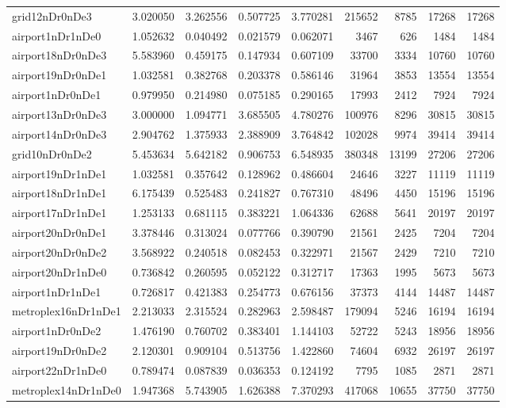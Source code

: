 \begin{longtable}{|l|r|r|r|r|r|r|r|r|}
grid12nDr0nDe3 & 3.020050 & 3.262556 & 0.507725 & 3.770281 & 215652 & 8785 & 17268 & 17268 \\
airport1nDr1nDe0 & 1.052632 & 0.040492 & 0.021579 & 0.062071 & 3467 & 626 & 1484 & 1484 \\
airport18nDr0nDe3 & 5.583960 & 0.459175 & 0.147934 & 0.607109 & 33700 & 3334 & 10760 & 10760 \\
airport19nDr0nDe1 & 1.032581 & 0.382768 & 0.203378 & 0.586146 & 31964 & 3853 & 13554 & 13554 \\
airport1nDr0nDe1 & 0.979950 & 0.214980 & 0.075185 & 0.290165 & 17993 & 2412 & 7924 & 7924 \\
airport13nDr0nDe3 & 3.000000 & 1.094771 & 3.685505 & 4.780276 & 100976 & 8296 & 30815 & 30815 \\
airport14nDr0nDe3 & 2.904762 & 1.375933 & 2.388909 & 3.764842 & 102028 & 9974 & 39414 & 39414 \\
grid10nDr0nDe2 & 5.453634 & 5.642182 & 0.906753 & 6.548935 & 380348 & 13199 & 27206 & 27206 \\
airport19nDr1nDe1 & 1.032581 & 0.357642 & 0.128962 & 0.486604 & 24646 & 3227 & 11119 & 11119 \\
airport18nDr1nDe1 & 6.175439 & 0.525483 & 0.241827 & 0.767310 & 48496 & 4450 & 15196 & 15196 \\
airport17nDr1nDe1 & 1.253133 & 0.681115 & 0.383221 & 1.064336 & 62688 & 5641 & 20197 & 20197 \\
airport20nDr0nDe1 & 3.378446 & 0.313024 & 0.077766 & 0.390790 & 21561 & 2425 & 7204 & 7204 \\
airport20nDr0nDe2 & 3.568922 & 0.240518 & 0.082453 & 0.322971 & 21567 & 2429 & 7210 & 7210 \\
airport20nDr1nDe0 & 0.736842 & 0.260595 & 0.052122 & 0.312717 & 17363 & 1995 & 5673 & 5673 \\
airport1nDr1nDe1 & 0.726817 & 0.421383 & 0.254773 & 0.676156 & 37373 & 4144 & 14487 & 14487 \\
metroplex16nDr1nDe1 & 2.213033 & 2.315524 & 0.282963 & 2.598487 & 179094 & 5246 & 16194 & 16194 \\
airport1nDr0nDe2 & 1.476190 & 0.760702 & 0.383401 & 1.144103 & 52722 & 5243 & 18956 & 18956 \\
airport19nDr0nDe2 & 2.120301 & 0.909104 & 0.513756 & 1.422860 & 74604 & 6932 & 26197 & 26197 \\
airport22nDr1nDe0 & 0.789474 & 0.087839 & 0.036353 & 0.124192 & 7795 & 1085 & 2871 & 2871 \\
metroplex14nDr1nDe0 & 1.947368 & 5.743905 & 1.626388 & 7.370293 & 417068 & 10655 & 37750 & 37750 \\

\end{longtable}
